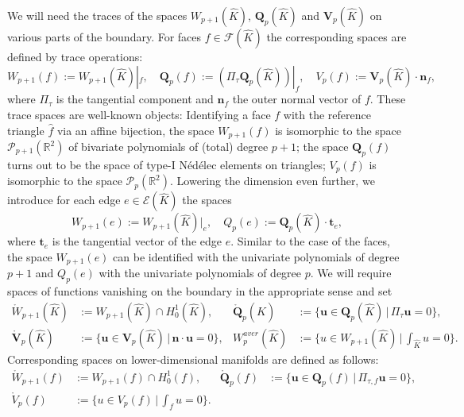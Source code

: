 \documentclass{article}
\begin{document}
We will need the traces of the spaces $W_{p+1}(\widehat{K})$, $\mathbf{Q}_p(\widehat{K})$ and $\mathbf{V}_p(\widehat{K})$ on various parts of the boundary. For faces $f\in{\mathcal{F}}(\widehat{K})$ the corresponding
spaces are defined by trace operations:
\begin{equation*}
W_{p+1}(f):=W_{p+1}(\widehat{K})|_{f},\quad{\mathbf{Q}}_{p}(f):=(\Pi_{\tau
}{\mathbf{Q}}_{p}(\widehat{K}))|_{f},\quad{V}_{p}(f):=\mathbf{V}%
_{p}(\widehat{K})\cdot\mathbf{n}_{f},
\end{equation*}
where $\Pi_{\tau}$ is the tangential component and $\mathbf{n}_{f}$ the outer normal
vector of $f$. These trace spaces are well-known objects: Identifying a face $f$
with the reference triangle $\widehat f$ via an affine bijection, the space $W_{p+1}(f)$
is isomorphic to the space ${\mathcal{P}}_{p+1}({\mathbb{R}}^{2})$ of bivariate
polynomials of (total) degree $p+1$; the space ${\mathbf{Q}}_{p}(f)$ turns out
to be the space of type-I
N\'{e}d\'{e}lec elements on triangles; ${V}_{p}(f)$ is isomorphic to the space
${\mathcal{P}}_{p}({\mathbb{R}}^{2})$. Lowering the dimension even further, we
introduce for each edge $e\in{\mathcal{E}}(\widehat{K})$ the spaces
\[
W_{p+1}(e):=W_{p+1}(\widehat{K})|_{e},\quad{Q}_{p}(e):=\mathbf{Q}%
_{p}(\widehat{K})\cdot\mathbf{t}_{e},
\]
where $\mathbf{t}_{e}$ is the tangential vector of the edge $e$. 
Similar to the case of the faces, the space $W_{p+1}(e)$ can be identified with the
univariate polynomials of degree $p+1$ and ${Q}_{p}(e)$ with the univariate
polynomials of degree $p$.
We will require spaces of functions vanishing on the boundary in the
appropriate sense and set
\begin{align*}
\mathring{W}_{p+1}(\widehat{K})& :=W_{p+1}(\widehat{K})\cap H_{0}^{1}%
(\widehat{K}), & 
\mathring{\mathbf{Q}}_{p}(\widehat{K})&:=\{\mathbf{u}%
\in{\mathbf{Q}}_{p}(\widehat{K})\,|\,\Pi_{\tau}\mathbf{u}=0\},\\
\mathring{\mathbf{V}}_{p}(\widehat{K})&:=\{\mathbf{u}\in{\mathbf{V}}_{p}(\widehat{K}%
)\,|\,\mathbf{n}\cdot\mathbf{u}=0\},
& W^{aver}_p(\widehat K)&:= \{u \in W_{p+1}(\widehat K)\,|\, \int_{\widehat K} u = 0\}.
\end{align*}
Corresponding spaces on lower-dimensional manifolds are defined as follows:
\begin{align*}
\mathring{W}_{p+1}(f) &:=W_{p+1}(f)\cap H_{0}^{1}(f),
& \mathring{\mathbf{Q}%
}_{p}(f)& :=\{\mathbf{u}\in{\mathbf{Q}}_{p}(f)\,|\,\Pi_{\tau,f}\mathbf{u}%
=0\},\\
\mathring{V}_{p}(f) &:=\{u \in V_{p}(f)\,|\, \int_{f} u = 0\}.
\end{align*}
\end{document}
